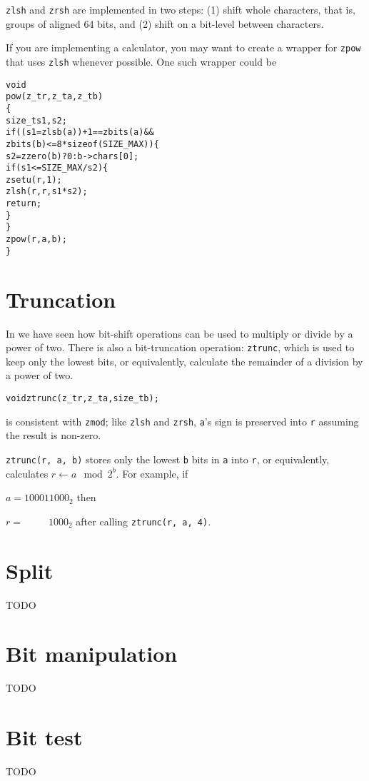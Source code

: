 {\tt zlsh} and {\tt zrsh} are implemented in two steps:
(1) shift whole characters, that is, groups of aligned
64 bits, and (2) shift on a bit-level between characters.

If you are implementing a calculator, you may want to
create a wrapper for {\tt zpow} that uses {\tt zlsh}
whenever possible. One such wrapper could be

\begin{alltt}
   void
   pow(z_t r, z_t a, z_t b)
   \{
       size_t s1, s2;
       if ((s1 = zlsb(a)) + 1 == zbits(a) &&
                     zbits(b) <= 8 * sizeof(SIZE_MAX)) \{
           s2 = zzero(b) ? 0 : b->chars[0];
           if (s1 <= SIZE_MAX / s2) \{
               zsetu(r, 1);
               zlsh(r, r, s1 * s2);
               return;
           \}
       \}
       zpow(r, a, b);
   \}
\end{alltt}


\newpage
\section{Truncation}
\label{sec:Truncation}

In  we have seen how bit-shift
operations can be used to multiply or divide by a
power of two. There is also a bit-truncation
operation: {\tt ztrunc}, which is used to keep
only the lowest bits, or equivalently, calculate
the remainder of a division by a power of two.

\begin{alltt}
   void ztrunc(z_t r, z_t a, size_t b);
\end{alltt}

\noindent
is consistent with {\tt zmod}; like {\tt zlsh} and
{\tt zrsh}, {\tt a}'s sign is preserved into {\tt r}
assuming the result is non-zero.

{\tt ztrunc(r, a, b)} stores only the lowest {\tt b}
bits in {\tt a} into {\tt r}, or equivalently,
calculates $r \gets a \mod 2^b$. For example, if

$a = 100011000_2$ then

$r = \phantom{10001}1000_2$ after calling
{\tt ztrunc(r, a, 4)}.


\newpage
\section{Split}
\label{sec:Split}

TODO %


\newpage
\section{Bit manipulation}
\label{sec:Bit manipulation}

TODO %


\newpage
\section{Bit test}
\label{sec:Bit test}

TODO %
